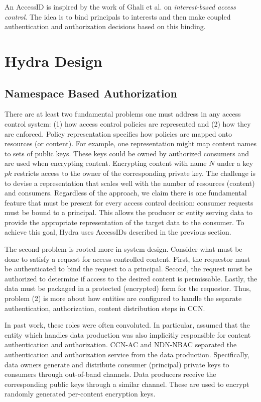 \documentclass[conference]{IEEEtran}
\begin{document}
An AccessID is inspired by the work of Ghali et al. \cite{ibac15} on
\emph{interest-based access control}. The idea is to bind principals to
interests and then make coupled authentication and authorization decisions
based on this binding. 

\section{Hydra Design}

\subsection{Namespace Based Authorization}

There are at least two fundamental problems one must address in any access control
system: (1) how access control policies are represented and (2) how they are enforced.
Policy representation specifies how policies are mapped onto resources (or content).
For example, one representation might map content names to sets of public keys. These
keys could be owned by authorized consumers and are used when encrypting content.
Encrypting content with name $N$ under a key $pk$ restricts access to the owner of
the corresponding private key. The challenge is to devise a representation that
scales well with the number of resources (content) and consumers. Regardless of
the approach, we claim there is one fundamental feature that must be present for
every access control decision: consumer requests must be bound to a principal.
This allows the producer or entity serving data to provide the appropriate
representation of the target data to the consumer. To achieve this goal, Hydra
uses AccessIDs described in the previous section.

The second problem is rooted more in system design. Consider what must be done
to satisfy a request for access-controlled content. First, the requestor must
be authenticated to bind the request to a principal. Second, the request must
be authorized to determine if access to the desired content is permissable. Lastly,
the data must be packaged in a protected (encrypted) form for the requestor. Thus,
problem (2) is more about how entities are configured to handle the separate
authentication, authorization, content distribution steps in CCN.

In past work, these roles were often convoluted. In particular, \cite{pre,be}
assumed that the entity which handles data production was also implicitly
responsible for content authentication and authorization. CCN-AC \cite{xx} and
NDN-NBAC \cite{xx} separated the authentication and authorization service from
the data production. Specifically, data owners generate and distribute consumer (principal)
private keys to consumers through out-of-band channels. Data producers receive
the corresponding public keys through a similar channel. These are used to encrypt
randomly generated per-content encryption keys.
\end{document}
